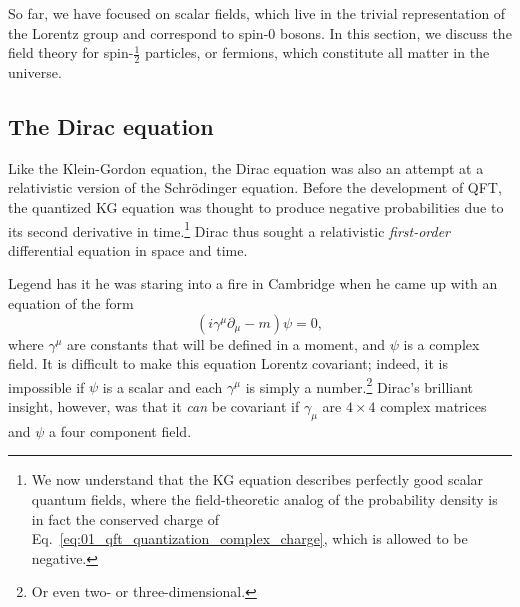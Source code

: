 So far, we have focused on scalar fields, which live in the trivial representation of the Lorentz group and correspond to spin-$0$ bosons.
In this section, we discuss the field theory for spin-$\frac{1}{2}$ particles, or fermions, which constitute all matter in the universe.

\subsection{The Dirac equation}
\label{sec:01_qft_spinors_dirac}


Like the Klein-Gordon equation, the Dirac equation was also an attempt at a relativistic version of the Schrödinger equation.
Before the development of QFT, the quantized KG equation was thought to produce negative probabilities due to its second derivative in time.\footnote{We now understand that the KG equation describes perfectly good scalar quantum fields, where the field-theoretic analog of the probability density is in fact the conserved charge of Eq.~\ref{eq:01_qft_quantization_complex_charge}, which is allowed to be negative.}
Dirac thus sought a relativistic \textit{first-order} differential equation in space and time.

Legend has it he was staring into a fire in Cambridge when he came up with an equation of the form
\begin{equation}
	\label{eq:01_qft_spinors_dirac}
	(i\gamma^\mu \partial_\mu - m)\psi = 0,
\end{equation}
where $\gamma^\mu$ are constants that will be defined in a moment, and $\psi$ is a complex field.
It is difficult to make this equation Lorentz covariant; indeed, it is impossible if $\psi$ is a scalar and each $\gamma^\mu$ is simply a number.\footnote{Or even two- or three-dimensional.}
Dirac's brilliant insight, however, was that it \textit{can} be covariant if $\gamma_\mu$ are $4\times 4$ complex matrices and $\psi$ a four component field.


